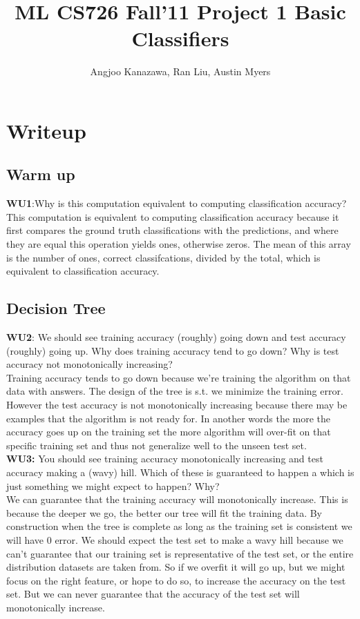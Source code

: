 \documentclass[a4paper,11pt]{article}
\begin{document}
\title{ML CS726 Fall'11 Project 1 Basic Classifiers}
\author{Angjoo Kanazawa, Ran Liu, Austin Myers}
\maketitle


\section{Writeup}
\subsection{Warm up}
\textbf{WU1}:\textsf{Why is this computation equivalent to computing classification
accuracy?}\\

This computation is equivalent to computing classification accuracy
because it first compares the ground truth classifications with the
predictions, and where they are equal this operation yields ones, otherwise
zeros. The mean of this array is the number of ones, correct classifcations, divided by the
total, which is equivalent to classification accuracy.

\subsection{Decision Tree}
\textbf{WU2}:\textsf{ We should see training accuracy (roughly) going down and
test accuracy (roughly) going up.  Why does training accuracy tend to
go down?  Why is test accuracy not monotonically
increasing?}\\

Training accuracy tends to go down because we're training the
algorithm on that data with answers. The design of the tree is s.t. we
minimize the training error. However the test accuracy is not
monotonically increasing because there may be examples that the
algorithm is not ready for. In another words the more the accuracy
goes up on the training set the more algorithm will over-fit on that
specific training set and thus not generalize well to the unseen test set.\\

\noindent
\textbf{WU3:} \textsf{You should see training accuracy monotonically increasing
and test accuracy making a (wavy) hill.  Which of these
is guaranteed to happen a which is just something we might
expect to happen?  Why?}\\

We can guarantee that the training accuracy will monotonically
increase. This is because the deeper we go, the better our tree will
fit the training data. By construction when the tree is complete as
long as the training set is consistent we will have 0 error. We should
expect the test set to make a wavy hill because we can't guarantee that
our training set is representative of the test set, or the entire
distribution datasets are taken from. So if we overfit it will go up,
but we might focus on the right feature, or hope to do so, to increase
the accuracy on the test set. But we can never guarantee that the
accuracy of the test set will monotonically increase.\\
\end{document}
